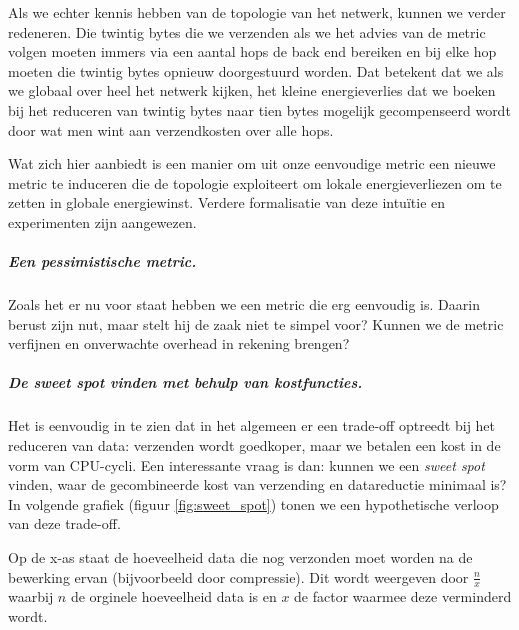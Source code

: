 \documentclass[11pt]{article}
\begin{document}
Als we echter kennis hebben van de topologie van het netwerk, kunnen we verder
redeneren. Die twintig bytes die we verzenden als we het advies van de metric
volgen moeten immers via een aantal hops de back end bereiken en bij elke hop
moeten die twintig bytes opnieuw doorgestuurd worden. Dat betekent dat we als we
globaal over heel het netwerk kijken, het kleine energieverlies dat we boeken
bij het reduceren van twintig bytes naar tien bytes mogelijk gecompenseerd wordt
door wat men wint aan verzendkosten over alle hops.

Wat zich hier aanbiedt is een manier om uit onze eenvoudige metric een nieuwe
metric te induceren die de topologie exploiteert om lokale energieverliezen om
te zetten in globale energiewinst. Verdere formalisatie van deze intu\"itie en
experimenten zijn aangewezen.

\subparagraph{Een pessimistische metric.}

Zoals het er nu voor staat hebben we een metric die erg eenvoudig is. Daarin
berust zijn nut, maar stelt hij de zaak niet te simpel voor? Kunnen we de metric
verfijnen en onverwachte overhead in rekening brengen? 


\subparagraph{De \textit{sweet spot} vinden met behulp van kostfuncties.}

Het is eenvoudig in te zien dat in het algemeen er een trade-off optreedt
bij het reduceren van data: verzenden wordt goedkoper, maar we betalen een kost
in de vorm van CPU-cycli. Een interessante vraag is dan: kunnen we een
\textit{sweet spot} vinden, waar de gecombineerde kost van verzending en
datareductie minimaal is?
\\
In volgende grafiek (figuur \ref{fig:sweet_spot}) tonen we een hypothetische
verloop van deze trade-off.



Op de x-as staat de hoeveelheid data die nog verzonden moet worden na de bewerking ervan (bijvoorbeeld door compressie). Dit wordt weergeven door $\frac{n}{x}$ waarbij $n$ de orginele hoeveelheid data is en $x$ de factor waarmee deze verminderd wordt. 
\end{document}
